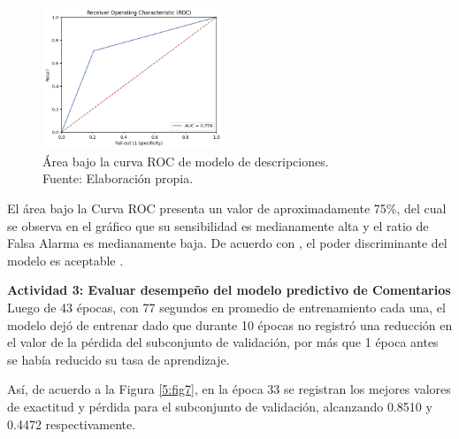 \begin{figure}[!ht]
	\begin{center}
		\includegraphics[width=0.48\textwidth]{5/figures/description_auc.png}
		\caption[Área bajo la curva ROC de modelo de descripciones]{Área bajo la curva ROC de modelo de descripciones.\\
		Fuente: Elaboración propia.}
		\label{5:fig6}
	\end{center}
	\vspace{-0.7cm}
\end{figure}

El área bajo la Curva ROC presenta un valor de aproximadamente 75\%, del cual se observa en el gráfico que su sensibilidad es medianamente alta y el ratio de Falsa Alarma es medianamente baja. De acuerdo con \cite{bk_britos2006datamining}, el poder discriminante del modelo es aceptable .

\vspace{0.3cm}
\textbf{Actividad 3: Evaluar desempeño del modelo predictivo de Comentarios}
\\
Luego de 43 épocas, con 77 segundos en promedio de entrenamiento cada una, el modelo dejó de entrenar dado que durante 10 épocas no registró una reducción en el valor de la pérdida del subconjunto de validación, por más que 1 época antes se había reducido su tasa de aprendizaje.

Así, de acuerdo a la Figura \ref{5:fig7}, en la época 33 se registran los mejores valores de exactitud y pérdida para el subconjunto de validación, alcanzando 0.8510 y 0.4472 respectivamente.

